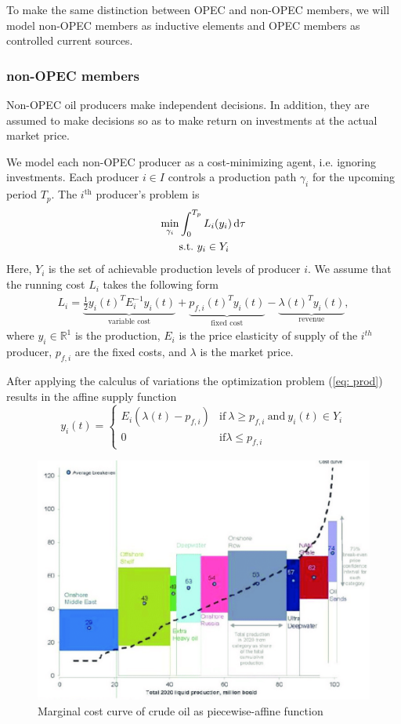 To make the same distinction between OPEC and non-OPEC members, we will model non-OPEC members as inductive elements and OPEC members as controlled current sources.

\subsubsection{non-OPEC members}
Non-OPEC oil producers make independent decisions.
In addition, they are assumed to make decisions so as to make return on investments at the actual market price.


We model each non-OPEC producer as a cost-minimizing agent, i.e. ignoring investments.
Each producer $i\in I$ controls a production path $\gamma_i$ for the upcoming period $T_p$.  
The $i^{\text{th}}$ producer's problem is 
\begin{equation}
    \label{eq: prod}
\begin{split}
\min_{\gamma_i} &\int_{0}^{T_p} L_{i}({y}_i)  \dif \tau \\
&\text{s.t.}\ {y}_i \in Y_i 
\end{split}
\end{equation}
Here, $Y_i$ is the set of achievable production levels of producer $i$. 
We assume that the running cost $L_{i}$ takes the following form
\begin{equation}
\label{eq: Li}
\begin{split}
 L_{i}=     \underbrace{\frac{1}{2}{{y}_i(t)}^TE_{i}^{-1}{{y}_i(t)}}_{\text{variable cost}}+\underbrace{{p}_{f,i}(t )^T{{y}_i}(t )}_{\text{fixed cost}}- \underbrace{ \lambda(t)^T{{y}_i}(t )}_{\text{revenue}},
 \end{split}
\end{equation}
where $y_i \in \mathbb{R}^1$ is the production, $E_i$ is the price elasticity of supply of the $i^{th}$ producer, $p_{f,i}$ are the fixed costs, and $\lambda$ is the market price.   

After applying the calculus of variations the optimization problem (\ref{eq: prod}) results in the affine supply function
\begin{equation}
y_i(t) = \begin{cases}
E_i(\lambda(t)-p_{f,i}) & \text{if}\ \lambda\geq p_{f,i}\ \text{and}\ y_i(t) \in Y_i\\
0 & \text{if} \lambda\leq p_{f,i}
\end{cases}
\end{equation}

\begin{figure}
    \centering
    \includegraphics[width=.4\textwidth]{Figures/cost curve.PNG}
    \caption{Marginal cost curve of crude oil as piecewise-affine function}
    \label{fig:marginalcost}
\end{figure}

